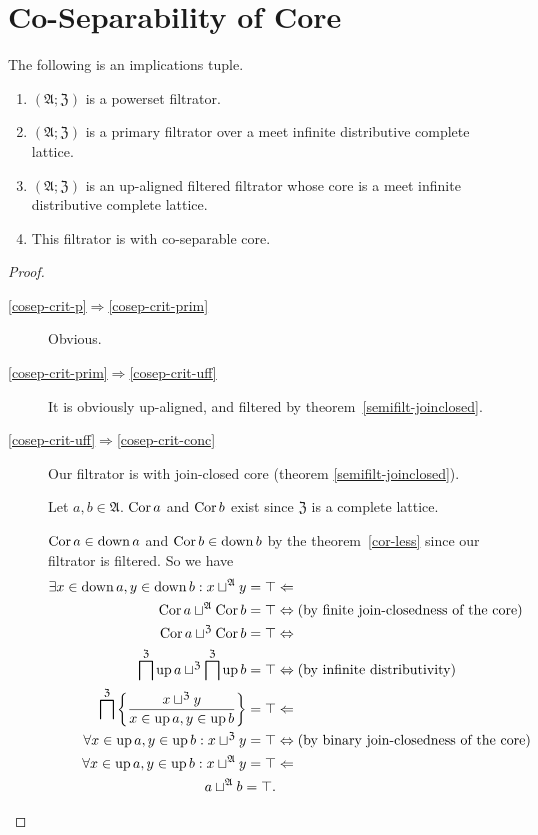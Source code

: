 \section{Co-Separability of Core}
\begin{thm}
\label{cosep-crit}The following is an implications tuple.
\begin{enumerate}
\item \label{cosep-crit-p}$(\mathfrak{A};\mathfrak{Z})$ is a powerset
filtrator.
\item \label{cosep-crit-prim}$(\mathfrak{A};\mathfrak{Z})$ is a primary
filtrator over a meet infinite distributive complete lattice.
\item \label{cosep-crit-uff}$(\mathfrak{A};\mathfrak{Z})$ is an up-aligned
filtered filtrator whose core is a meet infinite distributive complete
lattice.
\item \label{cosep-crit-conc}This filtrator is with co-separable core.
\end{enumerate}
\end{thm}
\begin{proof}
~
\begin{description}
\item [{\ref{cosep-crit-p}$\Rightarrow$\ref{cosep-crit-prim}}] Obvious.
\item [{\ref{cosep-crit-prim}$\Rightarrow$\ref{cosep-crit-uff}}] It
is obviously up-aligned, and filtered by theorem~\ref{semifilt-joinclosed}.
\item [{\ref{cosep-crit-uff}$\Rightarrow$\ref{cosep-crit-conc}}] Our
filtrator is with join-closed core (theorem \ref{semifilt-joinclosed}).


Let $a,b\in\mathfrak{A}$. $\operatorname{Cor} a$ and $\operatorname{Cor} b$ exist since $\mathfrak{Z}$
is a complete lattice.


$\operatorname{Cor} a\in\operatorname{down} a$ and $\operatorname{Cor} b\in\operatorname{down} b$ by the theorem~\ref{cor-less}
since our filtrator is filtered. So we have
\begin{align*}
\exists x\in\operatorname{down} a,y\in\operatorname{down} b:x\sqcup^{\mathfrak{A}}y=\top & \Leftarrow\\
\operatorname{Cor} a\sqcup^{\mathfrak{A}}\operatorname{Cor} b=\top & \Leftrightarrow\text{(by finite join-closedness of the core)}\\
\operatorname{Cor} a\sqcup^{\mathfrak{Z}}\operatorname{Cor} b=\top & \Leftrightarrow\\
\bigsqcap^{\mathfrak{Z}}\operatorname{up} a\sqcup^{\mathfrak{Z}}\bigsqcap^{\mathfrak{Z}}\operatorname{up} b=\top & \Leftrightarrow\text{(by infinite distributivity)}\\
\bigsqcap^{\mathfrak{Z}}\left\{ \frac{x\sqcup^{\mathfrak{Z}}y}{x\in\operatorname{up} a,y\in\operatorname{up} b}\right\}=\top & \Leftarrow\\
\forall x\in\operatorname{up} a,y\in\operatorname{up} b:x\sqcup^{\mathfrak{Z}}y=\top & \Leftrightarrow\text{(by binary join-closedness of the core)}\\
\forall x\in\operatorname{up} a,y\in\operatorname{up} b:x\sqcup^{\mathfrak{A}}y=\top & \Leftarrow\\
a\sqcup^{\mathfrak{A}}b=\top.
\end{align*}


\end{description}
\end{proof}

